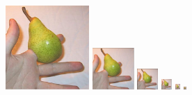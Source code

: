\documentclass[a4paper,12pt]{article}
\begin{document}
\begin{figure}[!ht]
\begin{minipage}[c]{0.1\textwidth}
\centering
\includegraphics[width=1.25in]{figures/pyramidal_0.png}
\end{minipage} 
\hspace{12ex}
\begin{minipage}[c]{0.1\textwidth}
\centering
\includegraphics[width=0.625in]{figures/pyramidal_1.png}
\end{minipage}
\hspace{1ex}
\begin{minipage}[c]{0.1\textwidth}
\centering
\includegraphics[width=0.3125in]{figures/pyramidal_2.png}
\end{minipage}
\begin{minipage}[c]{0.1\textwidth}
\centering
\includegraphics[width=0.15625in]{figures/pyramidal_3.png}
\end{minipage}
\begin{minipage}[c]{0.1\textwidth}
\centering
\includegraphics[width=0.078125in]{figures/pyramidal_4.png}
\end{minipage}
\begin{minipage}[c]{0.1\textwidth}
\centering
\includegraphics[width=0.0390625in]{figures/pyramidal_5.png}
\end{minipage}
\begin{minipage}[c]{0.1\textwidth}

\end{minipage}
\end{figure}
\end{document}

